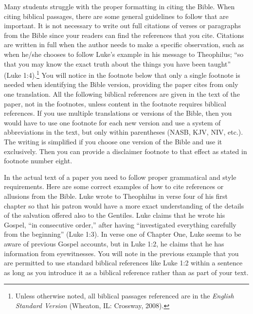 \documentclass[raggedright]{turabian-researchpaper}
\begin{document}
Many students struggle with the proper formatting in citing the Bible. When
citing biblical passages, there are some general guidelines to follow that are
important. It is not necessary to write out full citations of verses or
paragraphs from the Bible since your readers can find the references that you
cite. Citations are written in full when the author needs to make a specific
observation, such as when he/she chooses to follow Luke's example in his message
to Theophilus; ``so that you may know the exact truth about the things you have
been taught'' (Luke 1:4).\footnote{Unless otherwise noted, all biblical passages
referenced are in the \textit{English Standard Version} (Wheaton, IL: Crossway,
2008).} You will notice in the footnote below that only a single footnote is
needed when identifying the Bible version, providing the paper cites from only
one translation. All the following biblical references are given in the text of
the paper, not in the footnotes, unless content in the footnote requires
biblical references. If you use multiple translations or versions of the Bible,
then you would have to use one footnote for each new version and use a system of
abbreviations in the text, but only within parentheses (NASB, KJV, NIV, etc.).
The writing is simplified if you choose one version of the Bible and use it
exclusively. Then you can provide a disclaimer footnote to that effect as stated
in footnote number eight.

In the actual text of a paper you need to follow proper grammatical and style
requirements. Here are some correct examples of how to cite references or
allusions from the Bible. Luke wrote to Theophilus in verse four of his first
chapter so that his patron would have a more exact understanding of the details
of the salvation offered also to the Gentiles. Luke claims that he wrote his
Gospel, ``in consecutive order,'' after having ``investigated everything
carefully from the beginning'' (Luke 1:3). In verse one of Chapter One, Luke
seems to be aware of previous Gospel accounts, but in Luke 1:2, he claims that
he has information from eyewitnesses. You will note in the previous example that
you are permitted to use standard biblical references like Luke 1:2 within a
sentence as long as you introduce it as a biblical reference rather than as part
of your text.
\end{document}
